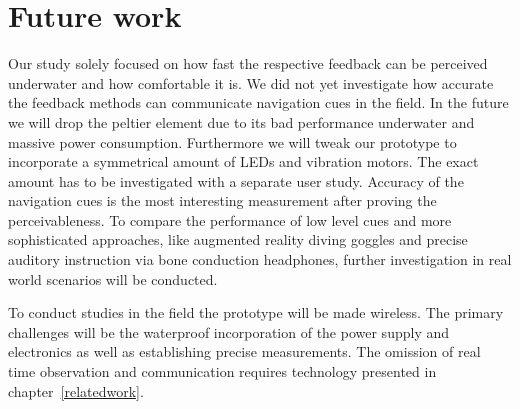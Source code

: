 \section{Future work}
\label{summaryandfuturework.futurework}
Our study solely focused on how fast the respective feedback can be perceived underwater and how comfortable it is.
We did not yet investigate how accurate the feedback methods can communicate navigation cues in the field.
In the future we will drop the peltier element due to its bad performance underwater and massive power consumption.
Furthermore we will tweak our prototype to incorporate a symmetrical amount of LEDs and vibration motors.
The exact amount has to be investigated with a separate user study.
Accuracy of the navigation cues is the most interesting measurement after proving the perceivableness.
To compare the performance of low level cues and more sophisticated approaches, like augmented reality diving goggles and precise auditory instruction via bone conduction headphones, further investigation in real world scenarios will be conducted.

To conduct studies in the field the prototype will be made wireless.
The primary challenges will be the waterproof incorporation of the power supply and electronics as well as establishing precise measurements.
The omission of real time observation and communication requires technology presented in chapter~\ref{relatedwork}. 


